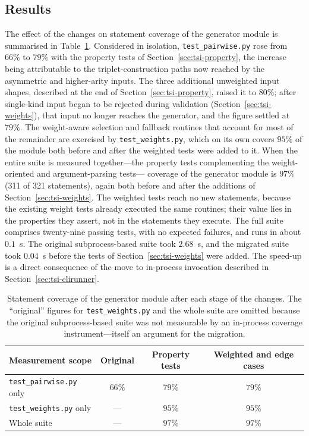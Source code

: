 \documentclass[
  digital, %
  oneside, %
  lof,     %
  nolot,     %
]{fithesis4}
\begin{document}
\subsection{Results}
\label{sec:tsi-results}

The effect of the changes on statement coverage of the generator module is
summarised in Table~\ref{tab:coverage}. Considered in isolation,
\texttt{test\_pairwise.py} rose from $66\%$ to $79\%$ with the property tests of
Section~\ref{sec:tsi-property}, the increase being attributable to the
triplet-construction paths now reached by the asymmetric and higher-arity
inputs. The three additional unweighted input shapes, described at the end of
Section~\ref{sec:tsi-property}, raised it to $80\%$; after single-kind input
began to be rejected during validation (Section~\ref{sec:tsi-weights}), that
input no longer reaches the generator, and the figure settled at $79\%$. The weight-aware selection and fallback routines that
account for most of the remainder are exercised by \texttt{test\_weights.py},
which on its own covers $95\%$ of the module both before and after the weighted
tests were added to it. When the entire suite is measured together---the
property tests complementing the weight-oriented and argument-parsing tests---
coverage of the generator module is $97\%$ (311 of 321 statements), again both
before and after the additions of Section~\ref{sec:tsi-weights}. The weighted
tests reach no new statements, because the existing weight tests already
executed the same routines; their value lies in the properties they assert, not
in the statements they execute. The full suite comprises twenty-nine passing tests, with no expected
failures, and runs in about $0.1$~s. The original subprocess-based suite took
$2.68$~s, and the migrated suite took $0.04$~s before the tests of
Section~\ref{sec:tsi-weights} were added. The speed-up is a direct consequence
of the move to in-process invocation described in Section~\ref{sec:tsi-clirunner}.

\begin{table}[h]
  \centering
  \begin{tabular}{lccc}
    \hline
    Measurement scope & Original & Property tests & Weighted and edge cases \\
    \hline
    \texttt{test\_pairwise.py} only & $66\%$ & $79\%$ & $79\%$ \\
    \texttt{test\_weights.py} only  & ---    & $95\%$ & $95\%$ \\
    Whole suite                     & ---    & $97\%$ & $97\%$ \\
    \hline
  \end{tabular}
  \caption{Statement coverage of the generator module after each stage of the
    changes. The ``original'' figures for \texttt{test\_weights.py} and the
    whole suite are omitted because the
    original subprocess-based suite was not measurable by an in-process coverage
    instrument---itself an argument for the migration.}
  \label{tab:coverage}
\end{table}
\end{document}
